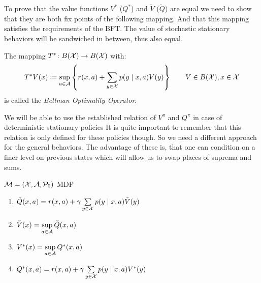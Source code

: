 To prove that the value functions \(V^*\) (\(Q^*\)) and \(\tilde{V}\) (\(\tilde{Q}\))  are equal we need to show that they are both fix points of the following mapping. 
And that this mapping satisfies the requirements of the BFT. The value of stochastic stationary behaviors will be sandwiched in between, thus also equal. 

\begin{definition}
The mapping \(T^*\colon B(\mathcal{X})\to B(\mathcal{X})\) with:
	\[
	 T^* V(x)\coloneqq \sup_{a\in\mathcal{A}}\left\{r(x,a)+\sum_{y\in\mathcal{X}}p(y\mid x,a) V(y)\right\} \qquad V\in B(\mathcal{X}), x\in\mathcal{X}
	\]
is called the \emph{Bellman Optimality Operator}.
\end{definition}

We will be able to use the established relation of \(V^\pi\) and \(Q^\pi\) in case of deterministic stationary policies
It is quite important to remember that this relation is only defined for these policies though. So we need a different approach for the general behaviors. The advantage of these is, that one can condition on a finer level on previous states which will allow us to swap places of suprema and sums.


\begin{lemma}\label{V*,Q* relation}\(\mathcal{M}=(\mathcal{X},\mathcal{A},\mathcal{P}_0)\) MDP
\begin{enumerate}[label=\textbf{(\roman*)},font=\normalfont]
\item\label{i:1} \(\tilde{Q}(x,a)= r(x,a)+\gamma\sum\limits_{y\in\mathcal{X}}p(y\mid x,a)\tilde{V}(y)\)
\item\label{i:2} \(\tilde{V}(x)= \sup\limits_{a\in\mathcal{A}} \tilde{Q}(x,a)\)
\item\label{i:3} \(V^*(x)=\sup\limits_{a\in\mathcal{A}}Q^*(x,a)\)
\item\label{i:4} \(Q^*(x,a)=r(x,a)+\gamma \sum\limits_{y\in\mathcal{X}}p(y\mid x,a) V^*(y)\)
\end{enumerate}
\end{lemma}

